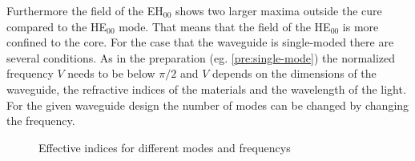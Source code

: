 Furthermore the field of the EH$_{00}$ shows two larger maxima outside the cure compared to the HE$_{00}$ mode. That means that the field of the HE$_{00}$ is more confined to the core.
\newpage
For the case that the waveguide is single-moded there are several conditions. As in the preparation (eg. \ref{pre:single-mode}) the normalized frequency $V$ needs to be below $\pi/2$ and $V$ depends on the dimensions of the waveguide, the refractive indices of the materials and the wavelength of the light.
For the given waveguide design the number of modes can be changed by changing the frequency. 
\begin{figure}[ht]%
\centering
\caption{Effective indices for different modes and frequencys}%
\label{fig:2_sweep}%
\end{figure}

